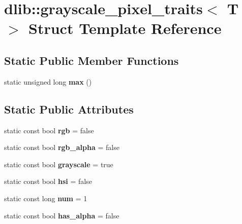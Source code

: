\hypertarget{structdlib_1_1grayscale__pixel__traits}{
\section{dlib::grayscale\_\-pixel\_\-traits$<$ T $>$ Struct Template Reference}
\label{structdlib_1_1grayscale__pixel__traits}
}
\subsection*{Static Public Member Functions}
\begin{DoxyCompactItemize}
\item 
\hypertarget{structdlib_1_1grayscale__pixel__traits_a498037e5fe257a43cf4d900646a3451f}{
static unsigned long {\bfseries max} ()}
\label{structdlib_1_1grayscale__pixel__traits_a498037e5fe257a43cf4d900646a3451f}

\end{DoxyCompactItemize}
\subsection*{Static Public Attributes}
\begin{DoxyCompactItemize}
\item 
\hypertarget{structdlib_1_1grayscale__pixel__traits_ae1ca1f27ee5ac33dc13b098d55fbad28}{
static const bool {\bfseries rgb} = false}
\label{structdlib_1_1grayscale__pixel__traits_ae1ca1f27ee5ac33dc13b098d55fbad28}

\item 
\hypertarget{structdlib_1_1grayscale__pixel__traits_a2a6aa062e40b5849d9e3becc29c8e898}{
static const bool {\bfseries rgb\_\-alpha} = false}
\label{structdlib_1_1grayscale__pixel__traits_a2a6aa062e40b5849d9e3becc29c8e898}

\item 
\hypertarget{structdlib_1_1grayscale__pixel__traits_a741a2bcf1f18844c5c0d47d594c05668}{
static const bool {\bfseries grayscale} = true}
\label{structdlib_1_1grayscale__pixel__traits_a741a2bcf1f18844c5c0d47d594c05668}

\item 
\hypertarget{structdlib_1_1grayscale__pixel__traits_a82b6b7e872250b16aebf7e029a8b8867}{
static const bool {\bfseries hsi} = false}
\label{structdlib_1_1grayscale__pixel__traits_a82b6b7e872250b16aebf7e029a8b8867}

\item 
\hypertarget{structdlib_1_1grayscale__pixel__traits_a8dcc500361adf59ad544e6143137df5e}{
static const long {\bfseries num} = 1}
\label{structdlib_1_1grayscale__pixel__traits_a8dcc500361adf59ad544e6143137df5e}

\item 
\hypertarget{structdlib_1_1grayscale__pixel__traits_a65b0ab709cee0fcf3d5ef63a7d27802e}{
static const bool {\bfseries has\_\-alpha} = false}
\label{structdlib_1_1grayscale__pixel__traits_a65b0ab709cee0fcf3d5ef63a7d27802e}

\end{DoxyCompactItemize}
